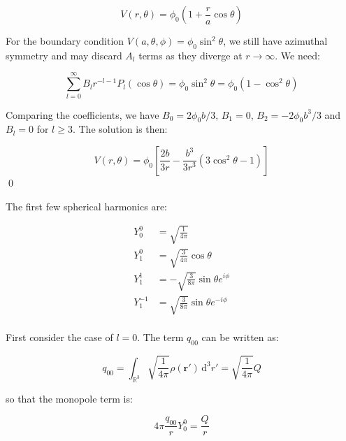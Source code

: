 \documentclass[12pt]{article}
\begin{document}
\begin{equation}
    V(r, \theta) = \phi_{0} \left( 1 + \frac{r}{a} \cos{\theta} \right)
\end{equation}

For the boundary condition $V(a, \theta, \phi) = \phi_{0} \sin^{2}{\theta}$, we still have azimuthal symmetry and may discard $A_{l}$ terms as they diverge at $r \to \infty$. We need:

\begin{equation}
    \sum_{l = 0}^{\infty} B_{l} r^{-l-1}  P_{l}(\cos{\theta}) = \phi_{0} \sin^{2}{\theta} = \phi_{0} (1 - \cos^{2}{\theta})
\end{equation}

Comparing the coefficients, we have $B_{0} = 2\phi_{0}b/3$, $B_{1} = 0$, $B_{2} = -2\phi_{0}b^{3}/3$ and $B_{l} = 0$ for $l \geq 3$. The solution is then:

\begin{equation}
    V(r, \theta) = \phi_{0} \left[ \frac{2b}{3r} - \frac{b^{3}}{3r^{3}} (3\cos^{2}{\theta} - 1) \right]
\end{equation}
\qed



The first few spherical harmonics are:

\begin{equation}
\begin{split}
    Y_{0}^{0} &= \sqrt{\frac{1}{4\pi}} \\
    Y_{1}^{0} &= \sqrt{\frac{3}{4\pi}} \cos{\theta} \\
    Y_{1}^{1} &= -\sqrt{\frac{3}{8\pi}} \sin{\theta} e^{i\phi} \\
    Y_{1}^{-1} &= \sqrt{\frac{3}{8\pi}} \sin{\theta} e^{-i\phi} \\
\end{split}
\end{equation}

First consider the case of $l = 0$. The term $q_{00}$ can be written as:

\begin{equation}
    q_{00} = \int_{\mathbb{R}^{3}} \sqrt{\frac{1}{4\pi}} \rho(\mathbf{r}') \, \mathrm{d}^{3}r' = \sqrt{\frac{1}{4\pi}} Q
\end{equation}

so that the monopole term is:

\begin{equation}
    4\pi \frac{q_{00}}{r} Y_{0}^{0} = \frac{Q}{r}
\end{equation}
\end{document}
